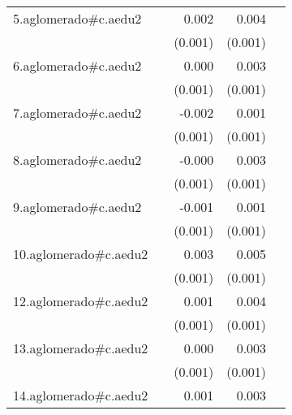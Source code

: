 {\begin{longtable}{l*{4}{D{.}{.}{-1}}}
\addlinespace
5.aglomerado#c.aedu2&                     &       0.002         &       0.004\sym{***}&                     \\
            &                     &     (0.001)         &     (0.001)         &                     \\
\addlinespace
6.aglomerado#c.aedu2&                     &       0.000         &       0.003\sym{**} &                     \\
            &                     &     (0.001)         &     (0.001)         &                     \\
\addlinespace
7.aglomerado#c.aedu2&                     &      -0.002         &       0.001         &                     \\
            &                     &     (0.001)         &     (0.001)         &                     \\
\addlinespace
8.aglomerado#c.aedu2&                     &      -0.000         &       0.003\sym{**} &                     \\
            &                     &     (0.001)         &     (0.001)         &                     \\
\addlinespace
9.aglomerado#c.aedu2&                     &      -0.001         &       0.001         &                     \\
            &                     &     (0.001)         &     (0.001)         &                     \\
\addlinespace
10.aglomerado#c.aedu2&                     &       0.003\sym{*}  &       0.005\sym{***}&                     \\
            &                     &     (0.001)         &     (0.001)         &                     \\
\addlinespace
12.aglomerado#c.aedu2&                     &       0.001         &       0.004\sym{***}&                     \\
            &                     &     (0.001)         &     (0.001)         &                     \\
\addlinespace
13.aglomerado#c.aedu2&                     &       0.000         &       0.003\sym{***}&                     \\
            &                     &     (0.001)         &     (0.001)         &                     \\
\addlinespace
14.aglomerado#c.aedu2&                     &       0.001         &       0.003\sym{***}&                     \\

\end{longtable}}

